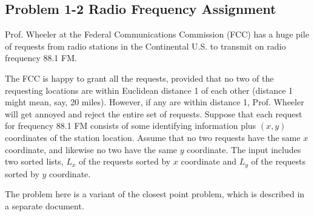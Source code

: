 \documentclass[12pt]{article}
\begin{document}
\subsection*{Problem 1-2 Radio Frequency Assignment}
\par{Prof. Wheeler at the Federal Communications Commission (FCC) has a huge pile of requests from radio stations in the Continental U.S. to transmit on radio frequency 88.1 FM.}
\par{The FCC is happy to grant all the requests, provided that no two of the requesting locations are within Euclidean distance 1 of each other (distance 1 might mean, say, 20 miles). However, if any are within distance 1, Prof. Wheeler will get annoyed and reject the entire set of requests. Suppose that each request for frequency 88.1 FM consists of some identifying information plus $(x, y)$ coordinates of the station location. Assume that no two requests have the same $x$ coordinate, and likewise no two have the same $y$ coordinate. The input includes two sorted lists, $L_x$ of the requests sorted by $x$ coordinate and $L_y$ of the requests sorted by $y$ coordinate.}
\par{The problem here is a variant of the closest point problem, which is described in a separate document.}
\end{document}
